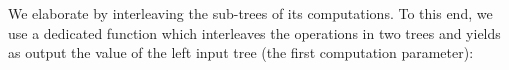 We elaborate  by interleaving the sub-trees of its computations.
To this end, we use a dedicated function which interleaves the operations in two trees and yields as output the value of the left input tree (the first computation parameter):
%
\begin{code}[hide]%
%
\>[2]\AgdaSpace{}%
\AgdaModule{\AgdaUnderscore{}}\AgdaSpace{}%
\AgdaSpace{}%
\AgdaSpace{}%
\AgdaSymbol{:}\AgdaSpace{}%
\AgdaSpace{}%
\AgdaSpace{}%
\<%
\\
\>[2][@{}l@{\AgdaIndent{0}}]%
\>[4]\AgdaSpace{}%
\<%
\\
%
\>[4]\<%
\end{code}
\begin{code}%
\>[4][@{}l@{\AgdaIndent{1}}]%
\>[6]%
\>[20]\AgdaSymbol{:}%
\>[23]\AgdaSymbol{\{}\AgdaSpace{}%
\AgdaSymbol{:}\AgdaSpace{}%
\AgdaSpace{}%
\AgdaSpace{}%
\AgdaSymbol{\}}\AgdaSpace{}%
\AgdaSpace{}%
\AgdaSpace{}%
\AgdaSymbol{(}\AgdaSpace{}%
\AgdaSpace{}%
\AgdaSpace{}%
\AgdaSymbol{)}\AgdaSpace{}%
\AgdaSpace{}%
\AgdaSpace{}%
\AgdaSpace{}%
\AgdaSymbol{(}\AgdaSpace{}%
\AgdaSpace{}%
\AgdaSpace{}%
\AgdaSymbol{)}\AgdaSpace{}%
\<%
\\
%
\>[20]%
\>[23]\AgdaSpace{}%
\AgdaSymbol{(}\AgdaSpace{}%
\AgdaSpace{}%
\AgdaSpace{}%
\AgdaSymbol{)}\AgdaSpace{}%
\<%
\end{code}
%
